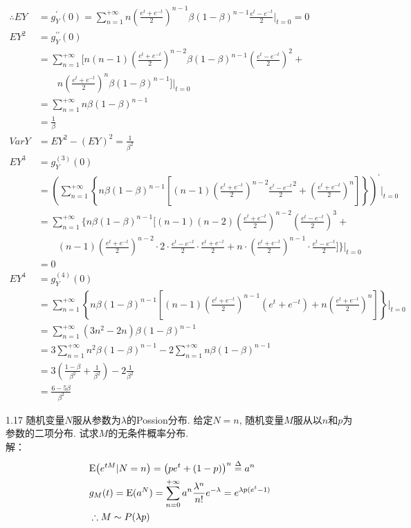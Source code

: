 	\[
	\begin{aligned}
	\therefore EY & = g^{\prime}_Y(0) = \sum^{+\infty}_{n=1} n {\left(\frac{e^t + e^{-t}}{2}\right)}^{n - 1}\beta (1 - \beta)^{n - 1} \frac{e^t - e^{-t}}{2} \bigg|_{t=0} = 0 \\
	EY^2 & = g^{\prime \prime}_Y(0) \\
		& = \sum^{+\infty}_{n=1}\bigg[ n(n-1)\left(\frac{e^t + e^{-t}}{2}\right)^{n-2}\beta (1 - \beta)^{n - 1} \left(\frac{e^t - e^{-t}}{2}\right)^2 + \\
		& \qquad n\left(\frac{e^t + e^{-t}}{2}\right)^n\beta (1 - \beta)^{n - 1} \bigg] \Bigg|_{t=0}\\
		& = \sum^{+\infty}_{n=1}n\beta(1-\beta)^{n-1}\\
		& = \frac{1}{\beta}\\
	VarY & = EY^2-(EY)^2 = \frac{1}{{\beta}^2}\\
	EY^3 & = g^{(3)}_Y(0)\\
		& = \left(\sum^{+\infty}_{n=1}\left\{n\beta(1-\beta)^{n-1}\left[(n-1)\left(\frac{e^t+e^{-t}}{2}\right)^{n-2}{\frac{e^t-e^{-t}}{2}}^2+\left(\frac{e^t+e^{-t}}{2}\right)^n\right]\right\}\right)^{\prime}\Bigg|_{t=0}\\
		& = \sum^{+\infty}_{n=1}\Bigg\{ n\beta{(1-\beta)}^{n-1}\Bigg[(n-1)(n-2)\left(\frac{e^t+e^{-t}}{2}\right)^{n-2}\left(\frac{e^t-e^{-t}}{2}\right)^{3}+ \\
		& \qquad (n-1)\left(\frac{e^t+e^{-t}}{2}\right)^{n-2} \cdot 2 \cdot \frac{e^t-e^{-t}}{2} \cdot \frac{e^t+e^{-t}}{2} + n \cdot \left(\frac{e^t+e^{-t}}{2}\right)^{n-1} \cdot \frac{e^t-e^{-t}}{2} \Bigg] \Bigg\} \Bigg|_{t=0}\\
		& = 0 \\
    EY^4 & = g^{(4)}_Y(0)\\ 
        & = \sum^{+\infty}_{n=1}\left\{n\beta(1-\beta)^{n-1}\left[(n-1)\left(\frac{e^t+e^{-t}}{2}\right)^{n-1}(e^t+e^{-t})+n\left(\frac{e^t+e^{-t}}{2}\right)^{n}\right]\right\} \Bigg|_{t=0}\\
        & = \sum^{+\infty}_{n=1}(3n^2-2n)\beta(1-\beta)^{n-1}\\
        & = 3\sum^{+\infty}_{n=1}n^2\beta(1-\beta)^{n-1} - 2\sum^{+\infty}_{n=1}n\beta(1-\beta)^{n-1}\\
        & = 3\left(\frac{1-\beta}{{\beta}^2} + \frac{1}{{\beta}^2}\right) - 2\frac{1}{{\beta}^2}\\
        & = \frac{6-5\beta}{{\beta}^2}
	\end{aligned}
	\]


1.17 随机变量$N$服从参数为$\lambda$的Possion分布. 给定$N=n$, 随机变量$M$服从以$n$和$p$为参数的二项分布. 试求$M$的无条件概率分布.\\
解：
\[
\begin{split}
& \mathrm{E}\big(e^{tM}|N=n\big) = \big(pe^t+(1-p)\big)^n \overset{\Delta}{=} a^n\\
& g_M(t) = \mathrm{E}(a^N) = \sum^{+\infty}_{n=0}a^n\frac{\lambda^n}{n!}e^{-\lambda} = e^{\lambda p(e^t-1)}\\
& \therefore M \sim P(\lambda p)
\end{split}
\]

